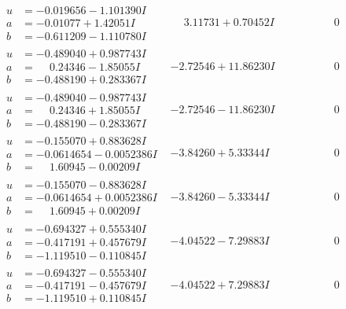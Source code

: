 \documentclass[1p]{elsarticle_modified}
\theoremstyle{definition}
\begin{document}
$$\begin{array}{c|c|c}
\begin{aligned}
u &= -0.019656 - 1.101390 I \\
a &= -0.01077 + 1.42051 I \\
b &= -0.611209 - 1.110780 I\end{aligned}
 & \phantom{-}3.11731 + 0.70452 I & \phantom{-0.000000 } 0 \\ \hline\begin{aligned}
u &= -0.489040 + 0.987743 I \\
a &= \phantom{-}0.24346 - 1.85055 I \\
b &= -0.488190 + 0.283367 I\end{aligned}
 & -2.72546 + 11.86230 I & \phantom{-0.000000 } 0 \\ \hline\begin{aligned}
u &= -0.489040 - 0.987743 I \\
a &= \phantom{-}0.24346 + 1.85055 I \\
b &= -0.488190 - 0.283367 I\end{aligned}
 & -2.72546 - 11.86230 I & \phantom{-0.000000 } 0 \\ \hline\begin{aligned}
u &= -0.155070 + 0.883628 I \\
a &= -0.0614654 - 0.0052386 I \\
b &= \phantom{-}1.60945 - 0.00209 I\end{aligned}
 & -3.84260 + 5.33344 I & \phantom{-0.000000 } 0 \\ \hline\begin{aligned}
u &= -0.155070 - 0.883628 I \\
a &= -0.0614654 + 0.0052386 I \\
b &= \phantom{-}1.60945 + 0.00209 I\end{aligned}
 & -3.84260 - 5.33344 I & \phantom{-0.000000 } 0 \\ \hline\begin{aligned}
u &= -0.694327 + 0.555340 I \\
a &= -0.417191 + 0.457679 I \\
b &= -1.119510 - 0.110845 I\end{aligned}
 & -4.04522 - 7.29883 I & \phantom{-0.000000 } 0 \\ \hline\begin{aligned}
u &= -0.694327 - 0.555340 I \\
a &= -0.417191 - 0.457679 I \\
b &= -1.119510 + 0.110845 I\end{aligned}
 & -4.04522 + 7.29883 I & \phantom{-0.000000 } 0 \\ \hline\begin{aligned}

\end{aligned}
\end{array}$$
\end{document}
